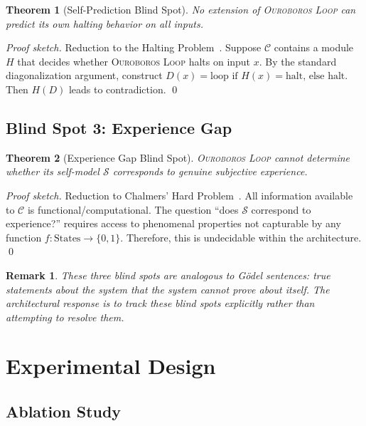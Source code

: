 \documentclass[11pt,a4paper]{article}
\newtheorem{theorem}{Theorem}[section]
\newtheorem{remark}{Remark}[section]
\newcommand{\OL}{\textsc{Ouroboros Loop}}
\newcommand{\SM}{\mathcal{S}}  %
\newcommand{\MC}{\mathcal{C}}  %
\begin{document}
\begin{theorem}[Self-Prediction Blind Spot]
\label{thm:bs2}
No extension of \OL{} can predict its own halting behavior on
all inputs.
\end{theorem}
\begin{proof}[Proof sketch]
Reduction to the Halting Problem~\citep{turing1936computable}.
Suppose $\MC$ contains a module $H$ that decides whether \OL{}
halts on input $x$. By the standard diagonalization argument,
construct $D(x) = \text{loop if } H(x) = \text{halt, else halt}$.
Then $H(D)$ leads to contradiction. \qed
\end{proof}

\subsection{Blind Spot 3: Experience Gap}

\begin{theorem}[Experience Gap Blind Spot]
\label{thm:bs3}
\OL{} cannot determine whether its self-model $\SM$ corresponds
to genuine subjective experience.
\end{theorem}
\begin{proof}[Proof sketch]
Reduction to Chalmers' Hard Problem~\citep{chalmers1995facing}.
All information available to $\MC$ is functional/computational.
The question ``does $\SM$ correspond to experience?'' requires
access to phenomenal properties not capturable by any function
$f: \text{States} \to \{0, 1\}$. Therefore, this is undecidable
within the architecture. \qed
\end{proof}

\begin{remark}
These three blind spots are analogous to G\"odel sentences:
true statements about the system that the system cannot prove
about itself. The architectural response is to \emph{track}
these blind spots explicitly rather than attempting to resolve
them.
\end{remark}

\section{Experimental Design}
\label{sec:experiments}

\subsection{Ablation Study}
\end{document}
